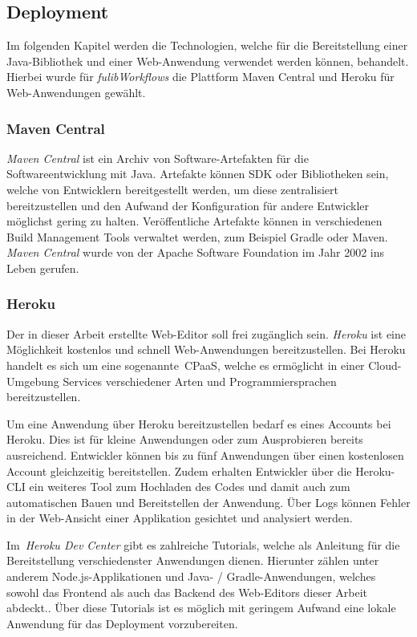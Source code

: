\subsection{Deployment}\label{subsec:deployment}
Im folgenden Kapitel werden die Technologien, welche für die Bereitstellung einer Java-Bibliothek und einer Web-Anwendung verwendet werden können, behandelt.
Hierbei wurde für \textit{fulibWorkflows} die Plattform Maven Central und Heroku für Web-Anwendungen gewählt.

\subsubsection{Maven Central}\label{subsubsec:mavencentral}
\textit{Maven Central} ist ein Archiv von Software-Artefakten für die Softwareentwicklung mit Java.
Artefakte können \ac{SDK} oder Bibliotheken sein, welche von Entwicklern bereitgestellt werden, um diese zentralisiert bereitzustellen
und den Aufwand der Konfiguration für andere Entwickler möglichst gering zu halten.
Veröffentliche Artefakte können in verschiedenen Build Management Tools verwaltet werden, zum Beispiel Gradle oder Maven.
\textit{Maven Central} wurde von der Apache Software Foundation im Jahr 2002 ins Leben gerufen\cite*{maven}.

\subsubsection{Heroku}\label{subsubsec:heroku}
Der in dieser Arbeit erstellte Web-Editor soll frei zugänglich sein.
\textit{Heroku} ist eine Möglichkeit kostenlos und schnell Web-Anwendungen bereitzustellen.
Bei Heroku handelt es sich um eine sogenannte~\ac{CPaaS}, welche es ermöglicht in einer Cloud-Umgebung
Services verschiedener Arten und Programmiersprachen bereitzustellen\cite*{heroku}.

Um eine Anwendung über Heroku bereitzustellen bedarf es eines Accounts bei Heroku.
Dies ist für kleine Anwendungen oder zum Ausprobieren bereits ausreichend.
Entwickler können bis zu fünf Anwendungen über einen kostenlosen Account gleichzeitig bereitstellen.
Zudem erhalten Entwickler über die Heroku-CLI ein weiteres Tool zum Hochladen des Codes und damit auch zum automatischen
Bauen und Bereitstellen der Anwendung.
Über Logs können Fehler in der Web-Ansicht einer Applikation gesichtet und analysiert werden.

Im~\textit{Heroku Dev Center} gibt es zahlreiche Tutorials, welche als Anleitung für die Bereitstellung verschiedenster Anwendungen dienen.
Hierunter zählen unter anderem Node.js-Applikationen und Java- / Gradle-Anwendungen, welches sowohl das Frontend als auch das Backend
des Web-Editors dieser Arbeit abdeckt.\cite*{herokuDev}.
Über diese Tutorials ist es möglich mit geringem Aufwand eine lokale Anwendung für das Deployment vorzubereiten.
